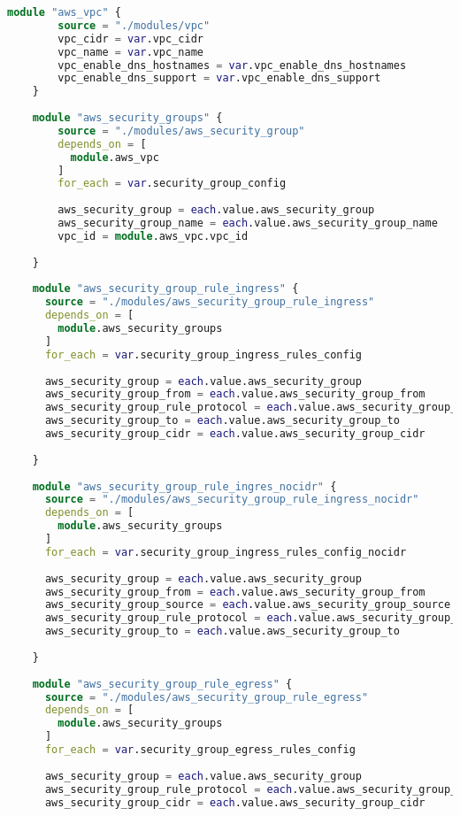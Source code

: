 \begin{lstlisting}[language=terraform]
    module "aws_vpc" {
        source = "./modules/vpc"
        vpc_cidr = var.vpc_cidr
        vpc_name = var.vpc_name
        vpc_enable_dns_hostnames = var.vpc_enable_dns_hostnames
        vpc_enable_dns_support = var.vpc_enable_dns_support     
    }
    
    module "aws_security_groups" {
        source = "./modules/aws_security_group"
        depends_on = [
          module.aws_vpc
        ]
        for_each = var.security_group_config
    
        aws_security_group = each.value.aws_security_group
        aws_security_group_name = each.value.aws_security_group_name
        vpc_id = module.aws_vpc.vpc_id
      
    }
    
    module "aws_security_group_rule_ingress" {
      source = "./modules/aws_security_group_rule_ingress"
      depends_on = [
        module.aws_security_groups
      ]
      for_each = var.security_group_ingress_rules_config
    
      aws_security_group = each.value.aws_security_group
      aws_security_group_from = each.value.aws_security_group_from
      aws_security_group_rule_protocol = each.value.aws_security_group_rule_protocol
      aws_security_group_to = each.value.aws_security_group_to
      aws_security_group_cidr = each.value.aws_security_group_cidr
      
    }
    
    module "aws_security_group_rule_ingres_nocidr" {
      source = "./modules/aws_security_group_rule_ingress_nocidr"
      depends_on = [
        module.aws_security_groups
      ]
      for_each = var.security_group_ingress_rules_config_nocidr
    
      aws_security_group = each.value.aws_security_group
      aws_security_group_from = each.value.aws_security_group_from
      aws_security_group_source = each.value.aws_security_group_source
      aws_security_group_rule_protocol = each.value.aws_security_group_rule_protocol
      aws_security_group_to = each.value.aws_security_group_to
      
    }
    
    module "aws_security_group_rule_egress" {
      source = "./modules/aws_security_group_rule_egress"
      depends_on = [
        module.aws_security_groups
      ]
      for_each = var.security_group_egress_rules_config
    
      aws_security_group = each.value.aws_security_group
      aws_security_group_rule_protocol = each.value.aws_security_group_rule_protocol
      aws_security_group_cidr = each.value.aws_security_group_cidr
      

\end{lstlisting}
